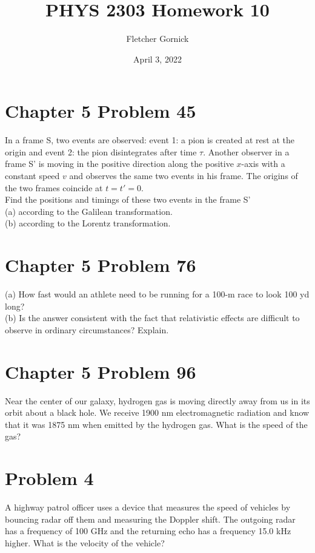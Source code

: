 \documentclass[11pt]{article}
\title{\vspace{-1.0cm}PHYS 2303 Homework 10}
\author{Fletcher Gornick}
\date{April 3, 2022}
\begin{document}
 \maketitle
 \section*{Chapter 5 Problem 45}
In a frame S, two events are observed: event 1: a pion is created at rest at the origin and event 2: 
the pion disintegrates after time \(\tau\). Another observer in a frame S' is moving in the 
positive direction along the positive \(x\)-axis with a constant speed \(v\) and observes the same 
two events in his frame. The origins of the two frames coincide at \(t = t' = 0\). \\

Find the positions and timings of these two events in the frame S' \\
(a) according to the Galilean transformation. \\
(b) according to the Lorentz transformation.
 \newpage

 \section*{Chapter 5 Problem 76}
(a) How fast would an athlete need to be running for a 100-m race to look 100 yd long? \\

(b) Is the answer consistent with the fact that relativistic effects are difficult to observe in 
ordinary circumstances? Explain.
 \newpage

 \section*{Chapter 5 Problem 96}
Near the center of our galaxy, hydrogen gas is moving directly away from us in its orbit about a 
black hole. We receive 1900 nm electromagnetic radiation and know that it was 1875 nm when emitted 
by the hydrogen gas. What is the speed of the gas?
 \newpage

 \section*{Problem 4}
 A highway patrol officer uses a device that measures the speed of vehicles by bouncing radar off 
 them and measuring the Doppler shift. The outgoing radar has a frequency of 100 GHz and the 
 returning echo has a frequency 15.0 kHz higher. What is the velocity of the vehicle?
\end{document}
